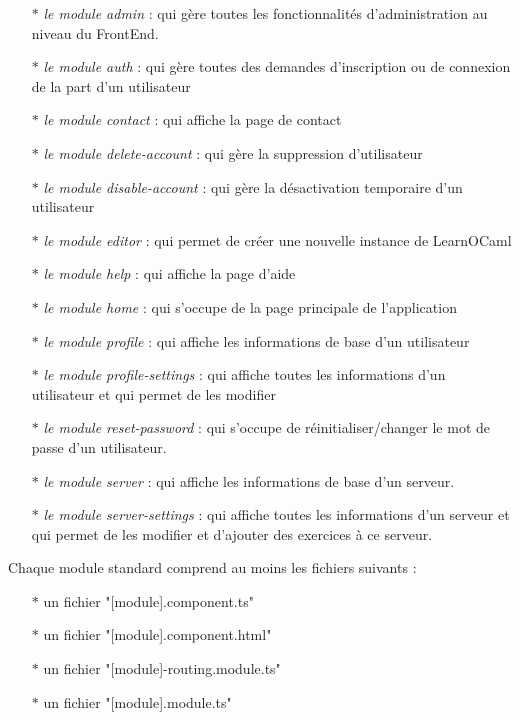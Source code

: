\documentclass{article}
\begin{document}
\begin{itemize}
	\item[$\ast$] \textit{le module admin} : qui gère toutes les fonctionnalités d'administration au niveau du FrontEnd.
	\item[$\ast$] \textit{le module auth} : qui gère toutes des demandes d'inscription ou de connexion de la part d'un utilisateur
	\item[$\ast$] \textit{le module contact} : qui affiche la page de contact
	\item[$\ast$] \textit{le module delete-account} : qui gère la suppression d'utilisateur
	\item[$\ast$] \textit{le module disable-account} : qui gère la désactivation temporaire d'un utilisateur
	\item[$\ast$] \textit{le module editor} : qui permet de créer une nouvelle instance de LearnOCaml
	\item[$\ast$] \textit{le module help} : qui affiche la page d'aide
	\item[$\ast$] \textit{le module home} : qui s'occupe de la page principale de l'application
	\item[$\ast$] \textit{le module profile} : qui affiche les informations de base d'un utilisateur
	\item[$\ast$] \textit{le module profile-settings} : qui affiche toutes les informations d'un utilisateur et qui permet de les modifier
	\item[$\ast$] \textit{le module reset-password} : qui s'occupe de réinitialiser/changer le mot de passe d'un utilisateur.
	\item[$\ast$] \textit{le module server} : qui affiche les informations de base d'un serveur.
	\item[$\ast$] \textit{le module server-settings} : qui affiche toutes les informations d'un serveur et qui permet de les modifier et d'ajouter des exercices à ce serveur.
\end{itemize}
Chaque module standard comprend au moins les fichiers suivants :
\begin{itemize}
	\item[$\ast$]un fichier "[module].component.ts"
	\item[$\ast$]un fichier "[module].component.html"
	\item[$\ast$]un fichier "[module]-routing.module.ts"
	\item[$\ast$]un fichier "[module].module.ts"
\end{itemize}
\end{document}
